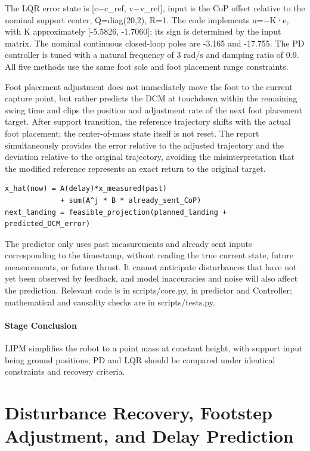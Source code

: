 The LQR error state is {[}c−c\_ref, v−v\_ref{]}, input is the CoP offset relative to the nominal support center, Q=diag(20,2), R=1. The code implements u=−K·e, with K approximately {[}-5.5826, -1.7060{]}; its sign is determined by the input matrix. The nominal continuous closed-loop poles are -3.165 and -17.755. The PD controller is tuned with a natural frequency of 3 rad/s and damping ratio of 0.9. All five methods use the same foot sole and foot placement range constraints.

Foot placement adjustment does not immediately move the foot to the current capture point, but rather predicts the DCM at touchdown within the remaining swing time and clips the position and adjustment rate of the next foot placement target. After support transition, the reference trajectory shifts with the actual foot placement; the center-of-mass state itself is not reset. The report simultaneously provides the error relative to the adjusted trajectory and the deviation relative to the original trajectory, avoiding the misinterpretation that the modified reference represents an exact return to the original target.

\begin{Verbatim}[breaklines=true,breakanywhere=true,fontsize=\footnotesize]
x_hat(now) = A(delay)*x_measured(past)
             + sum(A^j * B * already_sent_CoP)
next_landing = feasible_projection(planned_landing + predicted_DCM_error)
\end{Verbatim}

The predictor only uses past measurements and already sent inputs corresponding to the timestamp, without reading the true current state, future measurements, or future thrust. It cannot anticipate disturbances that have not yet been observed by feedback, and model inaccuracies and noise will also affect the prediction. Relevant code is in scripts/core.py, in predictor and Controller; mathematical and causality checks are in scripts/tests.py.


\paragraph{Stage Conclusion} LIPM simplifies the robot to a point mass at constant height, with support input being ground positions; PD and LQR should be compared under identical constraints and recovery criteria.


\FloatBarrier

\section{Disturbance Recovery, Footstep Adjustment, and Delay Prediction}

